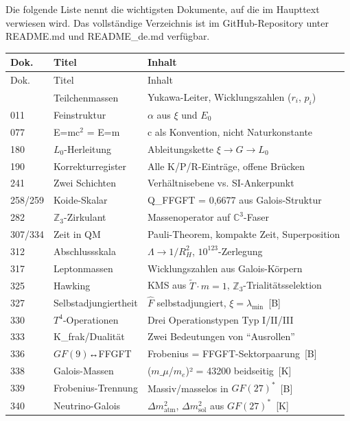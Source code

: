 \documentclass[11pt,oneside]{book}
\newcommand{\status}[1]{\penalty10000\,{\scriptsize\textcolor{gray!60}{[#1]}}}
\begin{document}
Die folgende Liste nennt die wichtigsten Dokumente, auf die im Haupttext
verwiesen wird. Das vollständige Verzeichnis ist im GitHub-Repository
unter README.md und README\_de.md verfügbar.


\begin{longtable}{lp{3.2cm}p{5.0cm}}
\toprule
Dok. & Titel & Inhalt \\
\midrule
\endfirsthead
\toprule
Dok. & Titel & Inhalt \\
\midrule
\endhead
\bottomrule
\endfoot
006 & Teilchenmassen & Yukawa-Leiter, Wicklungszahlen ($r_i$, $p_i$) \\
011 & Feinstruktur & $\alpha$ aus $\xi$ und $E_0$ \\
077 & E=mc$^2$ = E=m & c als Konvention, nicht Naturkonstante \\
180 & $L_0$-Herleitung & Ableitungskette $\xi \to G \to L_0$ \\
190 & Korrekturregister & Alle K/P/R-Einträge, offene Brücken \\
241 & Zwei Schichten & Verhältnisebene vs. SI-Ankerpunkt \\
258/259 & Koide-Skalar & Q\_FFGFT = 0,6677 aus Galois-Struktur \\
282 & $\mathbb{Z}_3$-Zirkulant & Massenoperator auf $\mathbb{C}^3$-Faser \\
307/334 & Zeit in QM & Pauli-Theorem, kompakte Zeit, Superposition \\
312 & Abschlussskala & $\Lambda \to 1/R_H^2$, $10^{123}$-Zerlegung \\
317 & Leptonmassen & Wicklungszahlen aus Galois-Körpern \\
325 & Hawking & KMS aus $\tilde{T}\cdot m=1$, $\mathbb{Z}_3$-Trialitätsselektion \\
327 & Selbstadjungiertheit & $\hat{F}$ selbstadjungiert, $\xi = \lambda_{\min}$ \status{B} \\
330 & $T^4$-Operationen & Drei Operationstypen Typ I/II/III \\
333 & K\_frak/Dualität & Zwei Bedeutungen von \enquote{Ausrollen} \\
336 & $GF(9)$↔FFGFT & Frobenius = FFGFT-Sektorpaarung \status{B} \\
338 & Galois-Massen & ($m\_\mu$/$m_e$)² = 43200 beidseitig \status{K} \\
339 & Frobenius-Trennung & Massiv/masselos in $GF(27)^*$ \status{B} \\
340 & Neutrino-Galois & $\Delta m^2_\text{atm}$, $\Delta m^2_\text{sol}$ aus $GF(27)^*$ \status{K} \\

\end{longtable}
\end{document}
